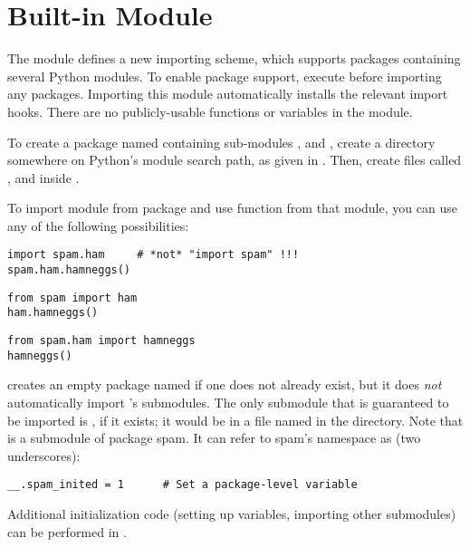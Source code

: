 \section{Built-in Module }
\label{module-ni}

The  module defines a new importing scheme, which supports
packages containing several Python modules.  To enable package
support, execute  before importing any packages.  Importing
this module automatically installs the relevant import hooks.  There
are no publicly-usable functions or variables in the  module.

To create a package named  containing sub-modules ,  and
, create a directory  somewhere on Python's module search
path, as given in .  Then, create files called ,  and
 inside .

To import module  from package  and use function
 from that module, you can use any of the following
possibilities:

\bcode\begin{verbatim}
import spam.ham		# *not* "import spam" !!!
spam.ham.hamneggs()
\end{verbatim}\ecode
%
\bcode\begin{verbatim}
from spam import ham
ham.hamneggs()
\end{verbatim}\ecode
%
\bcode\begin{verbatim}
from spam.ham import hamneggs
hamneggs()
\end{verbatim}\ecode
%
 creates an
empty package named  if one does not already exist, but it does
\emph{not} automatically import 's submodules.  
The only submodule that is guaranteed to be imported is
, if it exists; it would be in a file named
 in the  directory.  Note that
 is a submodule of package spam.  It can refer to
spam's namespace as \code{__} (two underscores):

\bcode\begin{verbatim}
__.spam_inited = 1		# Set a package-level variable
\end{verbatim}\ecode
%
Additional initialization code (setting up variables, importing other
submodules) can be performed in .
